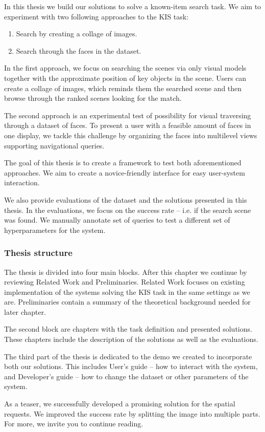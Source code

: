 In this thesis we build our solutions to solve a known-item search task. We aim to experiment with two following approaches to the KIS task:

\begin{enumerate}
  \item Search by creating a collage of images.
  \item Search through the faces in the dataset.
\end{enumerate}

In the first approach, we focus on searching the scenes via only visual models together with the approximate position of key objects in the scene. Users can create a collage of images, which reminds them the searched scene and then browse through the ranked scenes looking for the match.

The second approach is an experimental test of possibility for visual traversing through a  dataset of faces. To present a user with a feasible amount of faces in one display, we tackle this challenge by organizing the faces into multilevel views supporting navigational queries.

The goal of this thesis is to create a framework to test both aforementioned approaches. We aim to create a novice-friendly interface for easy user-system interaction.

We also provide evaluations of the dataset and the solutions presented in this thesis. In the evaluations, we focus on the success rate -- i.e. if the search scene was found. We manually annotate set of queries to test a different set of hyperparameters for the system.

\subsubsection*{Thesis structure}

The thesis is divided into four main blocks. After this chapter we continue by reviewing Related Work and Preliminaries. Related Work focuses on existing implementation of the systems solving the KIS task in the same settings as we are. Preliminaries contain a summary of the theoretical background needed for later chapter.

The second block are chapters with the task definition and presented solutions. These chapters include the description of the solutions as well as the evaluations.

The third part of the thesis is dedicated to the demo we created to incorporate both our solutions. This includes User's guide -- how to interact with the system, and Developer's guide -- how to change the dataset or other parameters of the system.

\bigskip
As a teaser, we successfully developed a promising solution for the spatial requests. We improved the success rate by splitting the image into multiple parts. For more, we invite you to continue reading. 
